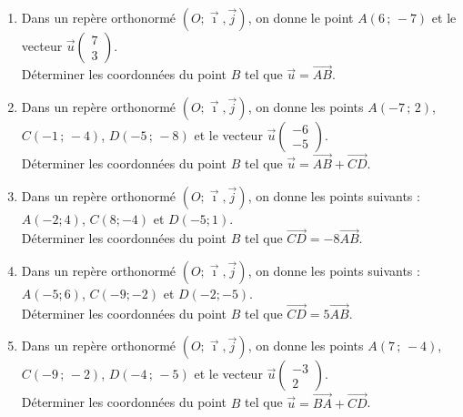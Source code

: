 {%
\begin{Exercice}%
\leavevmode\vspace{-\baselineskip}
\begin{enumerate}[itemsep=1em]
	\item \begin{minipage}[t]{\linewidth}Dans un repère orthonormé $(O;\vec \imath, \overrightarrow{j})$, on donne le point $A(6\,;\,-7)$ et le vecteur $\overrightarrow{u}\begin{pmatrix}7\\3\end{pmatrix}$.\\Déterminer les coordonnées du point $B$ tel que $\overrightarrow{u}=\overrightarrow{AB}$.\end{minipage}
	\item \begin{minipage}[t]{\linewidth}Dans un repère orthonormé $(O;\vec \imath, \overrightarrow{j})$, on donne les points $A(-7\,;\,2)$, $C(-1\,;\,-4)$, $D(-5\,;\,-8)$ et le vecteur $\overrightarrow{u}\begin{pmatrix}-6\\-5\end{pmatrix}$.\\Déterminer les coordonnées du point $B$ tel que $\overrightarrow{u}=\overrightarrow{AB}+\overrightarrow{CD}$.\end{minipage}
	\item \begin{minipage}[t]{\linewidth}Dans un repère orthonormé $(O;\vec \imath, \overrightarrow{j})$, on donne les points suivants : $A(-2;4)$, $C(8;-4)$ et $D(-5;1)$.\\Déterminer les coordonnées du point $B$ tel que $\overrightarrow{CD}=-8\overrightarrow{AB}$.\end{minipage}
	\item \begin{minipage}[t]{\linewidth}Dans un repère orthonormé $(O;\vec \imath, \overrightarrow{j})$, on donne les points suivants : $A(-5;6)$, $C(-9;-2)$ et $D(-2;-5)$.\\Déterminer les coordonnées du point $B$ tel que $\overrightarrow{CD}=5\overrightarrow{AB}$.\end{minipage}
	\item \begin{minipage}[t]{\linewidth}Dans un repère orthonormé $(O;\vec \imath, \overrightarrow{j})$, on donne les points $A(7\,;\,-4)$, $C(-9\,;\,-2)$, $D(-4\,;\,-5)$ et le vecteur $\overrightarrow{u}\begin{pmatrix}-3\\2\end{pmatrix}$.\\Déterminer les coordonnées du point $B$ tel que $\overrightarrow{u}=\overrightarrow{BA}+\overrightarrow{CD}$.\end{minipage}

\end{enumerate}
\end{Exercice}}
